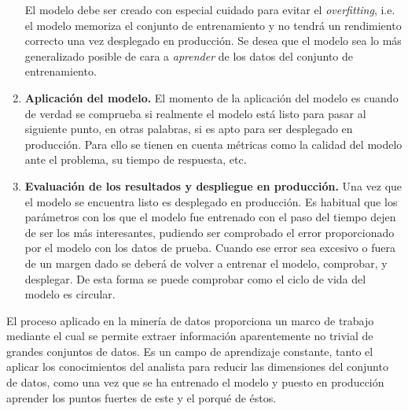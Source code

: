 \begin{enumerate}
    El modelo debe ser creado con especial cuidado para evitar el \textit{overfitting}, i.e. el modelo memoriza el conjunto de entrenamiento y no tendrá un rendimiento correcto una vez desplegado en producción. Se desea que el modelo sea lo más generalizado posible de cara a \textit{aprender} de los datos del conjunto de entrenamiento.

    \item \textbf{Aplicación del modelo.}
	El momento de la aplicación del modelo es cuando de verdad se comprueba si realmente el modelo está listo para pasar al siguiente punto, en otras palabras, si es apto para ser desplegado en producción. 
	Para ello se tienen en cuenta métricas como la calidad del modelo ante el problema, su tiempo de respuesta, etc.
    
	\item \textbf{Evaluación de los resultados y despliegue en producción.}
	Una vez que el modelo se encuentra listo es desplegado en producción. Es habitual que los parámetros con los que el modelo fue entrenado con el paso del tiempo dejen de ser los más interesantes, pudiendo ser comprobado el error proporcionado por el modelo con los datos de prueba. Cuando ese error sea excesivo o fuera de un margen dado se deberá de volver a entrenar el modelo, comprobar, y desplegar. 
	De esta forma se puede comprobar como el ciclo de vida del modelo es circular.
\end{enumerate}

El proceso aplicado en la minería de datos proporciona un marco de trabajo mediante el cual se permite extraer información aparentemente no trivial de grandes conjuntos de datos. 
Es un campo de aprendizaje constante, tanto el aplicar los conocimientos del analista para reducir las dimensiones del conjunto de datos, como una vez que se ha entrenado el modelo y puesto en producción aprender los puntos fuertes de este y el porqué de éstos.\cite{Chapman2000CRISPDM1S}

